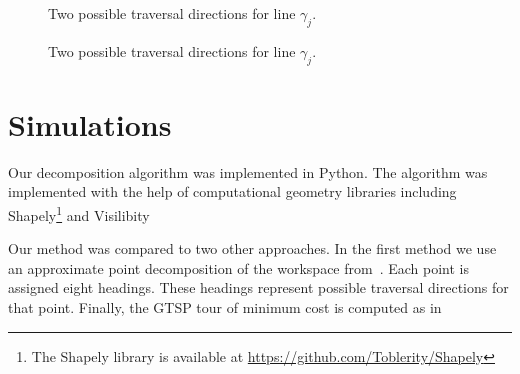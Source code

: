 \documentclass[../main.tex]{subfiles}
\begin{document}
\begin{figure}
	\centering
	
	\caption{Two possible traversal directions for line $\gamma_j$.}
	\label{fig:traversal_directions}
\end{figure}
\begin{figure}
	\centering
	
	\caption{Two possible traversal directions for line $\gamma_j$.}
	\label{fig:cost}
\end{figure}

\section{Simulations}
\label{section:single_agent_simulation}
Our decomposition algorithm was implemented in Python. The algorithm was implemented with the help of computational geometry libraries including Shapely\footnote{The Shapely library is available at \url{https://github.com/Toblerity/Shapely}} and Visilibity%

Our method was compared to two other approaches. In the first method we use an approximate point decomposition of the workspace from~\cite{arkin2000approximation}. Each point is assigned eight headings. These headings represent possible traversal directions for that point. Finally, the GTSP tour of minimum cost is computed as in%
\end{document}
